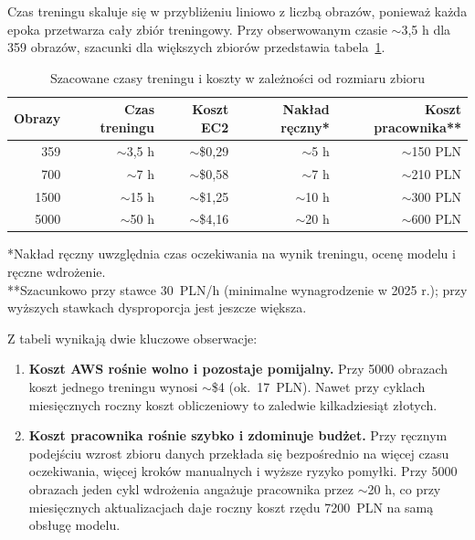 Czas treningu skaluje się w przybliżeniu liniowo z liczbą obrazów, ponieważ każda epoka przetwarza cały zbiór treningowy. Przy obserwowanym czasie $\sim$3,5 h dla 359 obrazów, szacunki dla większych zbiorów przedstawia tabela~\ref{tab:skalowanie}.

\begin{table}[H]
\centering
\caption{Szacowane czasy treningu i koszty w zależności od rozmiaru zbioru}
\label{tab:skalowanie}
\begin{tabular}{|r|r|r|r|r|}
\hline
\textbf{Obrazy} & \textbf{Czas treningu} & \textbf{Koszt EC2} & \textbf{Nakład ręczny*} & \textbf{Koszt pracownika**} \\
\hline
359   & $\sim$3{,}5 h &  $\sim$\$0{,}29 & $\sim$5 h   & $\sim$150 PLN \\
700   & $\sim$7 h    &  $\sim$\$0{,}58 & $\sim$7 h   & $\sim$210 PLN \\
1500  & $\sim$15 h   &  $\sim$\$1{,}25 & $\sim$10 h  & $\sim$300 PLN \\
5000  & $\sim$50 h   &  $\sim$\$4{,}16 & $\sim$20 h  & $\sim$600 PLN \\
\hline
\end{tabular}
\end{table}

\noindent\small{*Nakład ręczny uwzględnia czas oczekiwania na wynik treningu, ocenę modelu i ręczne wdrożenie.}\\
\noindent\small{**Szacunkowo przy stawce 30~PLN/h (minimalne wynagrodzenie w 2025 r.); przy wyższych stawkach dysproporcja jest jeszcze większa.}

\vspace{0.5em}

Z tabeli wynikają dwie kluczowe obserwacje:

\begin{enumerate}
  \item \textbf{Koszt AWS rośnie wolno i pozostaje pomijalny.} Przy 5000 obrazach koszt jednego treningu wynosi $\sim$\$4 (ok.~17~PLN). Nawet przy cyklach miesięcznych roczny koszt obliczeniowy to zaledwie kilkadziesiąt złotych.

  \item \textbf{Koszt pracownika rośnie szybko i zdominuje budżet.} Przy ręcznym podejściu wzrost zbioru danych przekłada się bezpośrednio na więcej czasu oczekiwania, więcej kroków manualnych i wyższe ryzyko pomyłki. Przy 5000 obrazach jeden cykl wdrożenia angażuje pracownika przez $\sim$20 h, co przy miesięcznych aktualizacjach daje roczny koszt rzędu 7200~PLN na samą obsługę modelu.
\end{enumerate}

